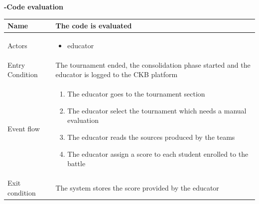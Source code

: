 \begin{enumerate}[label=\textbf{[UC\arabic*]}]
        \item  \textbf{-Code evaluation}
    \\ \begin{tabular}{|l|p{11cm}|}
        \hline
        Name & The code is evaluated \\
        \hline
        Actors & \begin{itemize}
                    \item educator
                \end{itemize} \\
        \hline
        Entry Condition & The tournament ended, the consolidation phase started and the educator is logged to the CKB platform\\
        \hline
        Event flow & \begin{enumerate}
            \item The educator goes to the tournament section
            \item The educator select the tournament which needs a manual evaluation
            \item The educator reads the sources produced by the teams
            \item The educator assign a score to each student enrolled to the battle
        \end{enumerate}\\
        \hline
        Exit condition &  The system stores the score provided by the educator\\
        

\end{tabular}
\end{enumerate}
